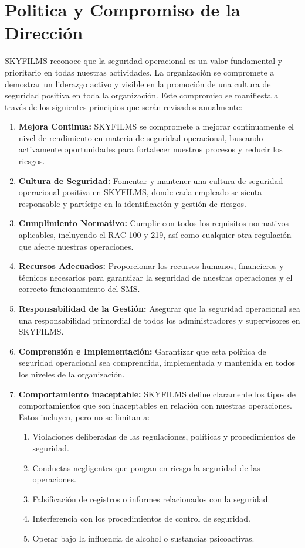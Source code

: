 
\section{Politica y Compromiso de la Dirección}
SKYFILMS reconoce que la seguridad operacional es un valor fundamental y prioritario en todas nuestras actividades. La organización se compromete a demostrar un liderazgo activo y visible en la promoción de una cultura de seguridad positiva en toda la organización. Este compromiso se manifiesta a través de los siguientes principios que serán revisados anualmente:

\begin{enumerate}
    \item \textbf{Mejora Continua:} SKYFILMS se compromete a mejorar continuamente el nivel de rendimiento en materia de seguridad operacional, buscando activamente oportunidades para fortalecer nuestros procesos y reducir los riesgos.
    \item \textbf{Cultura de Seguridad:} Fomentar y mantener una cultura de seguridad operacional positiva en SKYFILMS, donde cada empleado se sienta responsable y partícipe en la identificación y gestión de riesgos.
    \item \textbf{Cumplimiento Normativo:} Cumplir con todos los requisitos normativos aplicables, incluyendo el RAC 100 y 219, así como cualquier otra regulación que afecte nuestras operaciones.
    \item \textbf{Recursos Adecuados:} Proporcionar los recursos humanos, financieros y técnicos necesarios para garantizar la seguridad de nuestras operaciones y el correcto funcionamiento del SMS.
    \item \textbf{Responsabilidad de la Gestión:} Asegurar que la seguridad operacional sea una responsabilidad primordial de todos los administradores y supervisores en SKYFILMS.
    \item \textbf{Comprensión e Implementación:} Garantizar que esta política de seguridad operacional sea comprendida, implementada y mantenida en todos los niveles de la organización.
    \item \textbf{Comportamiento inaceptable:} SKYFILMS define claramente los tipos de comportamientos que son inaceptables en relación con nuestras operaciones. Estos incluyen, pero no se limitan a:
    
        \begin{enumerate}[label=(\roman*)]
            \item Violaciones deliberadas de las regulaciones, políticas y procedimientos de seguridad.
            \item Conductas negligentes que pongan en riesgo la seguridad de las operaciones.
            \item Falsificación de registros o informes relacionados con la seguridad.
            \item Interferencia con los procedimientos de control de seguridad.
            \item Operar bajo la influencia de alcohol o sustancias psicoactivas.
        \end{enumerate}
    

\end{enumerate}
